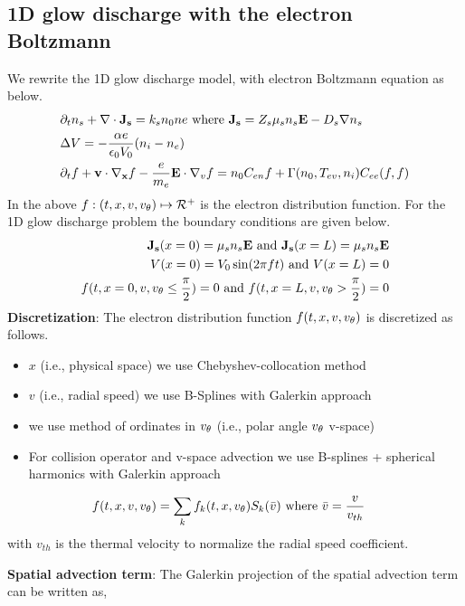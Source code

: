 \documentclass{article}[draft]
\begin{document}
\subsection{1D glow discharge with the electron Boltzmann}
We rewrite the 1D glow discharge model, with electron Boltzmann equation as below. 
\begin{align}
	&\partial_t n_s + \nabla \cdot \mathbf{J_s} = k_s n_0 ne \text{ where } \mathbf{J_s} = Z_{s} \mu_{s} n_{s} \mathbf{E} -D_{s} \nabla n_{s}\\
	& \Delta V = -\frac{\alpha e}{\epsilon_0 V_0} (n_i-n_e) \\
	& \partial_t f + \mathbf{v} \cdot \nabla_{\mathbf{x}} f -\frac{e}{m_e} \mathbf{E} \cdot \nabla_{v} f = n_0 C_{en}f + \Gamma(n_0, T_{ev}, n_i) C_{ee} (f, f) 
\end{align} In the above $f: (t, x, v, {v_{\theta}}) \mapsto \mathcal{R}^+$ is the electron distribution function. For the 1D glow discharge problem the boundary conditions are given below. 
\begin{align}
	\mathbf{J_s}(x=0) = \mu_s n_s \mathbf{E} \text{ and } \mathbf{J_s}(x=L) = \mu_s n_s \mathbf{E} \\
	V(x=0) = V_0\sin(2\pi f t) \text{ and } V(x=L) = 0 \\
	f(t, x=0, v, {v_{\theta}} \leq \frac{\pi}{2}) = 0 \text{ and } f(t, x=L, v, {v_{\theta}} > \frac{\pi}{2}) = 0
\end{align}
\textbf{Discretization}: The electron distribution function $f(t, x, v, {v_{\theta}})$ is discretized as follows. 
\begin{itemize}
	\item $x$ (i.e., physical space) we use Chebyshev-collocation method
	\item $v$ (i.e., radial speed) we use B-Splines with Galerkin approach
	\item we use method of ordinates in ${v_{\theta}}$ (i.e., polar angle ${v_{\theta}}$ v-space) 
	\item For collision operator and v-space advection we use B-splines + spherical harmonics with Galerkin approach
\end{itemize} 
\begin{align}
	&f(t, x, v, \vtheta) = \sum_{k} f_{k}(t,x,\vtheta) S_k\of{\bar{v}} \text{ where } \bar{v} = \frac{v}{v_{th}} 
\end{align} with $v_{th}$ is the thermal velocity to normalize the radial speed coefficient.
\par \textbf{Spatial advection term}: The Galerkin projection of the spatial advection term can be written as, 
\end{document}
